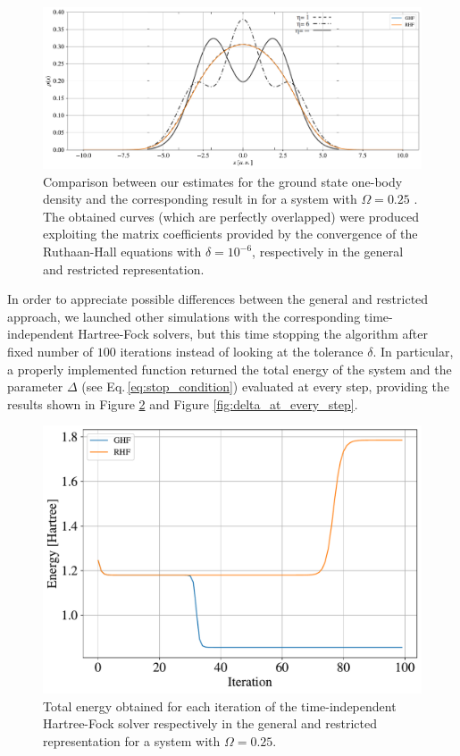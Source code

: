 \begin{figure}[h!]
    \centering
    \includegraphics[scale=0.5]{images/onebody_density_comp_article.pdf}
    \caption{Comparison between our estimates for the ground state one-body density and the corresponding result in \cite{Zanghellini_2004} for a system with $\Omega=0.25$ . The obtained curves (which are perfectly overlapped) were produced exploiting the matrix coefficients provided by the convergence of the Ruthaan-Hall equations with $\delta=10^{-6}$, respectively in the general and restricted representation.}
    \label{fig:one_body_density_comp}
\end{figure}

In order to appreciate possible differences between the general and restricted approach, we launched other simulations with the corresponding time-independent Hartree-Fock solvers, but this time stopping the algorithm after fixed number of $100$ iterations instead of looking at the tolerance $\delta$. In particular, a properly implemented function returned the total energy of the system and the parameter $\Delta$ (see Eq.\,\ref{eq:stop_condition}) evaluated at every step, providing the results shown in Figure \ref{fig:energy_at_every_step} and Figure \ref{fig:delta_at_every_step}.

\begin{figure}[t!]
    \centering
    \includegraphics[scale=0.38]{images/energy_at_every_step.pdf}
    \caption{Total energy obtained for each iteration of the time-independent Hartree-Fock solver respectively in the general and restricted representation for a system with $\Omega=0.25$.}
    \label{fig:energy_at_every_step}
\end{figure}

